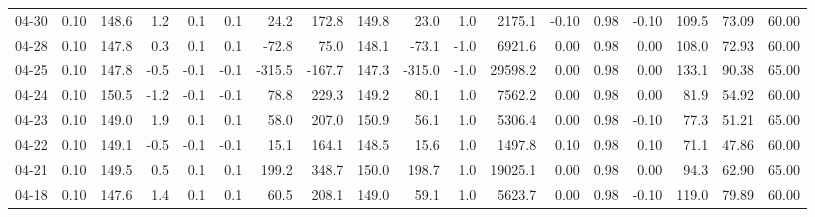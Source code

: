\begin{threeparttable}
{\begin{tabular}{lrrrrrrrrrrrrrrrrr}
  04-30 &     0.10 & 148.6 &               1.2 &               0.1 &                0.1 &               24.2 &  172.8 & 149.8 &       23.0 &                      1.0 &              2175.1 &      -0.10 &      0.98 &          -0.10 &            109.5 &           73.09 &                  60.00 \\
  04-28 &     0.10 & 147.8 &               0.3 &               0.1 &                0.1 &              -72.8 &   75.0 & 148.1 &      -73.1 &                     -1.0 &              6921.6 &       0.00 &      0.98 &           0.00 &            108.0 &           72.93 &                  60.00 \\
  04-25 &     0.10 & 147.8 &              -0.5 &              -0.1 &               -0.1 &             -315.5 & -167.7 & 147.3 &     -315.0 &                     -1.0 &             29598.2 &       0.00 &      0.98 &           0.00 &            133.1 &           90.38 &                  65.00 \\
  04-24 &     0.10 & 150.5 &              -1.2 &              -0.1 &               -0.1 &               78.8 &  229.3 & 149.2 &       80.1 &                      1.0 &              7562.2 &       0.00 &      0.98 &           0.00 &             81.9 &           54.92 &                  60.00 \\
  04-23 &     0.10 & 149.0 &               1.9 &               0.1 &                0.1 &               58.0 &  207.0 & 150.9 &       56.1 &                      1.0 &              5306.4 &       0.00 &      0.98 &          -0.10 &             77.3 &           51.21 &                  65.00 \\
  04-22 &     0.10 & 149.1 &              -0.5 &              -0.1 &               -0.1 &               15.1 &  164.1 & 148.5 &       15.6 &                      1.0 &              1497.8 &       0.10 &      0.98 &           0.10 &             71.1 &           47.86 &                  60.00 \\
  04-21 &     0.10 & 149.5 &               0.5 &               0.1 &                0.1 &              199.2 &  348.7 & 150.0 &      198.7 &                      1.0 &             19025.1 &       0.00 &      0.98 &           0.00 &             94.3 &           62.90 &                  65.00 \\
  04-18 &     0.10 & 147.6 &               1.4 &               0.1 &                0.1 &               60.5 &  208.1 & 149.0 &       59.1 &                      1.0 &              5623.7 &       0.00 &      0.98 &          -0.10 &            119.0 &           79.89 &                  60.00 \\

\end{tabular}}
\end{threeparttable}
